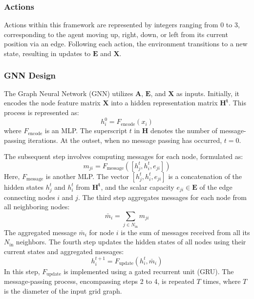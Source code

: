 \documentclass[letterpaper]{article}
\begin{document}
\subsubsection{Actions}
Actions within this framework are represented by integers ranging from 0 to 3, corresponding to the agent moving up, right, down, or left from its current position via an edge. Following each action, the environment transitions to a new state, resulting in updates to \(\mathbf{E}\) and \(\mathbf{X}\).

\subsubsection{GNN Design}
The Graph Neural Network (GNN) utilizes \(\mathbf{A}\), \(\mathbf{E}\), and \(\mathbf{X}\) as inputs. Initially, it encodes the node feature matrix \(\mathbf{X}\) into a hidden representation matrix \(\mathbf{H^t}\). This process is represented as:
\begin{equation}
    h_i^0 = F_{\text{encode}}(x_i)
\end{equation}
where \(F_{\text{encode}}\) is an MLP. The superscript \(t\) in \(\mathbf{H}\) denotes the number of message-passing iterations. At the outset, when no message passing has occurred, \(t=0\). 

The subsequent step involves computing messages for each node, formulated as:
\begin{equation}
    m_{ji} = F_{\text{message}}([h_j^t, h_i^t, e_{ji}])
\end{equation}
Here, \(F_{\text{message}}\) is another MLP. The vector \([h_j^t, h_i^t, e_{ji}]\) is a concatenation of the hidden states \(h_j^t\) and \(h_i^t\) from \(\mathbf{H^t}\), and the scalar capacity \(e_{ji} \in \mathbf{E}\) of the edge connecting nodes \(i\) and \(j\). The third step aggregates messages for each node from all neighboring nodes:
\begin{equation}
    \bar{m}_{i} = \sum_{j \in N_{\text{in}}} m_{ji}
\end{equation}
The aggregated message \(\bar{m}_{i}\) for node \(i\) is the sum of messages received from all its \(N_{\text{in}}\) neighbors. The fourth step updates the hidden states of all nodes using their current states and aggregated messages:
\begin{equation}
    h_{i}^{t+1} = F_{\text{update}}(h_{i}^t, \bar{m}_{i})
\end{equation}
In this step, \(F_{\text{update}}\) is implemented using a gated recurrent unit (GRU). The message-passing process, encompassing steps 2 to 4, is repeated \(T\) times, where \(T\) is the diameter of the input grid graph.
\end{document}
